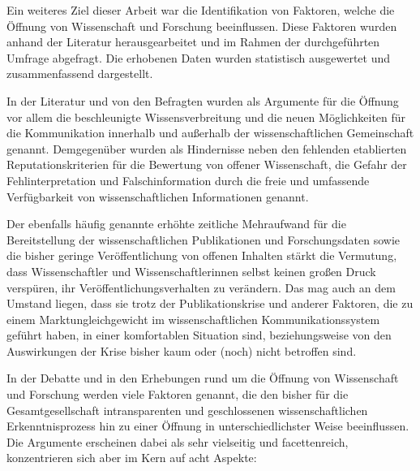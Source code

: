 Ein weiteres Ziel dieser Arbeit war die Identifikation von Faktoren, welche die Öffnung von Wissenschaft und Forschung beeinflussen. Diese Faktoren wurden anhand der Literatur herausgearbeitet und im Rahmen der durchgeführten Umfrage abgefragt. Die erhobenen Daten wurden statistisch ausgewertet und zusammenfassend dargestellt.

In der Literatur und von den Befragten wurden als Argumente für die Öffnung vor allem die beschleunigte Wissensverbreitung und die neuen Möglichkeiten für die Kommunikation innerhalb und außerhalb der wissenschaftlichen Gemeinschaft genannt. Demgegenüber wurden als Hindernisse neben den fehlenden etablierten Reputationskriterien für die Bewertung von offener Wissenschaft, die Gefahr der Fehlinterpretation und Falschinformation durch die freie und umfassende Verfügbarkeit von wissenschaftlichen Informationen genannt.

Der ebenfalls häufig genannte erhöhte zeitliche Mehraufwand für die Bereitstellung der wissenschaftlichen Publikationen und Forschungsdaten sowie die bisher geringe Veröffentlichung von offenen Inhalten stärkt die Vermutung, dass Wissenschaftler und Wissenschaftlerinnen selbst keinen großen Druck verspüren, ihr Veröffentlichungsverhalten zu verändern. Das mag auch an dem Umstand liegen, dass sie trotz der Publikationskrise und anderer Faktoren, die zu einem Marktungleichgewicht im wissenschaftlichen Kommunikationssystem geführt haben, in einer komfortablen Situation sind, beziehungsweise von den Auswirkungen der Krise bisher kaum oder (noch) nicht betroffen sind.

In der Debatte und in den Erhebungen rund um die Öffnung von Wissenschaft und Forschung werden viele Faktoren genannt, die den bisher für die Gesamtgesellschaft intransparenten und geschlossenen wissenschaftlichen Erkenntnisprozess hin zu einer Öffnung in unterschiedlichster Weise beeinflussen. Die Argumente erscheinen dabei als sehr vielseitig und facettenreich, konzentrieren sich aber im Kern auf acht Aspekte:

